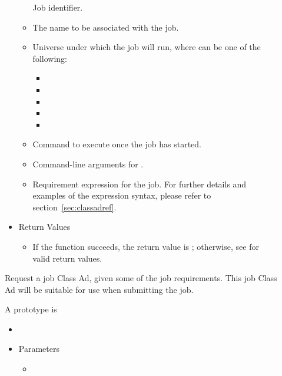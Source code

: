 \begin{description}
\begin{itemize}
\begin{itemize}
      Job identifier.
      \item[]  

      The name to be associated with the job.
      \item[] 

      Universe under which the job will run, where  can be
      one of the following:


      \begin{itemize}
        \item[] 
	\item[] 
	\item[] 
	\item[]	 
	\item[]	
      \end{itemize}
      
      \item[]  

      Command to execute once the job has started.
      \item[] 

      Command-line arguments for .
      \item[] 

      Requirement expression for the job. For further details 
      and examples of the expression syntax, please refer to 
      section~\ref{sec:classadref}.
    \end{itemize}
    \item[] Return Values
    \begin{itemize}
      \item[] If the function succeeds, the return value is ; 
      otherwise, see  for valid return values. 
    \end{itemize}
  \end{itemize}
 
  Request a job Class Ad, given some of the job requirements.
  This job Class Ad will be suitable for use when submitting the job.

\item [\Code{discoverJobRequirements}]
  A prototype is 

  \begin{itemize}
    \item[] 
    \item[] Parameters
    \begin{itemize}
      \item[]  


\end{itemize}
\end{itemize}
\end{description}
